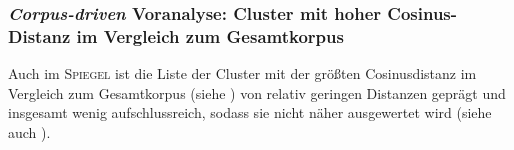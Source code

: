 \subsubsection{\texorpdfstring{\emph{Corpus-driven} Voranalyse: Cluster mit hoher Cosinus-Distanz im Vergleich zum Gesamtkorpus}{Corpus-driven Voranalyse: Cluster mit hoher Cosinus-Distanz im Vergleich zum Gesamtkorpus}}\label{corpus-driven-voranalyse-cluster-mit-hoher-cosinus-distanz-im-vergleich-zum-gesamtkorpus-2}

Auch im \textsc{Spiegel} ist die Liste der Cluster mit der größten Cosinusdistanz im Vergleich zum Gesamtkorpus (siehe ) von relativ geringen Distanzen geprägt und insgesamt wenig aufschlussreich, sodass sie nicht näher ausgewertet wird (siehe auch ).


